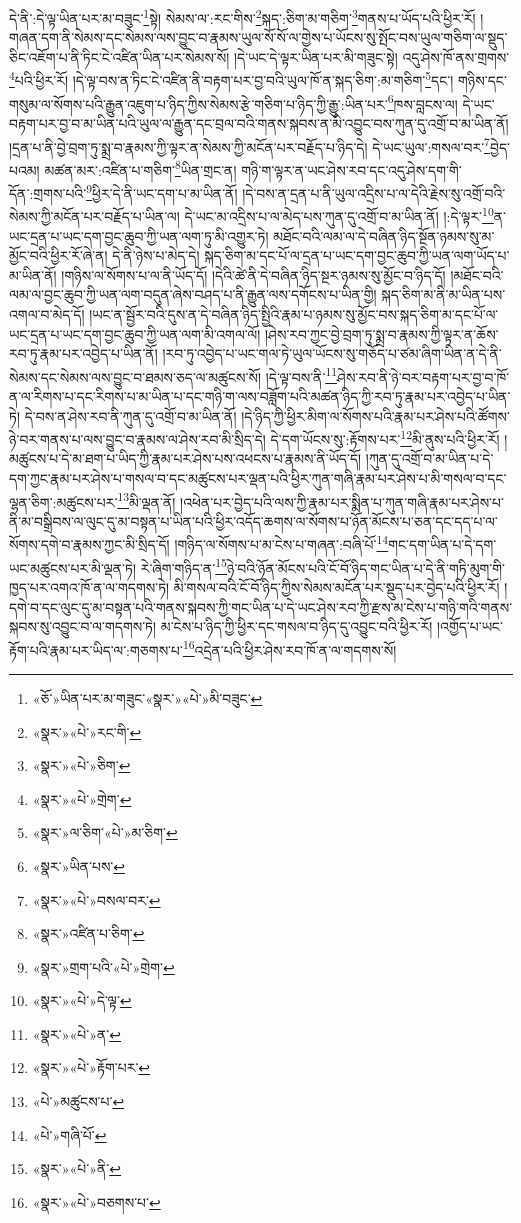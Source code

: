 དེ་ནི་:དེ་ལྟ་ཡིན་པར་མ་བཟུང་\footnote{«ཅོ་»ཡིན་པར་མ་གཟུང་«སྣར་»«པེ་»མི་བཟུང་}སྟེ། སེམས་ལ་:རང་གིས་\footnote{«སྣར་»«པེ་»རང་གི་}སྐད་:ཅིག་མ་གཅིག་\footnote{«སྣར་»«པེ་»ཅིག་}གནས་པ་ཡོད་པའི་ཕྱིར་རོ། །གཞན་དག་ནི་སེམས་དང་སེམས་ལས་བྱུང་བ་རྣམས་ཡུལ་སོ་སོ་ལ་གྱེས་པ་ཡོངས་སུ་སྤོང་བས་ཡུལ་གཅིག་ལ་སྡུད་ཅིང་འཇོག་པ་ནི་ཏིང་ངེ་འཛིན་ཡིན་པར་སེམས་སོ། །དེ་ཡང་དེ་ལྟར་ཡིན་པར་མི་གཟུང་སྟེ། འདུ་ཤེས་ཁོ་ནས་གྲགས་\footnote{«སྣར་»«པེ་»གྲེག་}པའི་ཕྱིར་རོ། །དེ་ལྟ་བས་ན་ཏིང་ངེ་འཛིན་ནི་བརྟག་པར་བྱ་བའི་ཡུལ་ཁོ་ན་སྐད་ཅིག་:མ་གཅིག་\footnote{«སྣར་»ལ་ཅིག་«པེ་»མ་ཅིག་}དང་། གཉིས་དང་གསུམ་ལ་སོགས་པའི་རྒྱུན་འཇུག་པ་ཉིད་ཀྱིས་སེམས་རྩེ་གཅིག་པ་ཉིད་ཀྱི་རྒྱུ་:ཡིན་པར་\footnote{«སྣར་»ཡིན་པས་}ཁས་བླངས་ལ། དེ་ཡང་བརྟག་པར་བྱ་བ་མ་ཡིན་པའི་ཡུལ་ལ་རྒྱུན་དང་བྲལ་བའི་གནས་སྐབས་ན་མི་འབྱུང་བས་ཀུན་དུ་འགྲོ་བ་མ་ཡིན་ནོ། །དྲན་པ་ནི་བྱེ་བྲག་ཏུ་སྨྲ་བ་རྣམས་ཀྱི་ལྟར་ན་སེམས་ཀྱི་མངོན་པར་བརྗོད་པ་ཉིད་དེ། དེ་ཡང་ཡུལ་:གསལ་བར་\footnote{«སྣར་»«པེ་»བསལ་བར་}བྱེད་པའམ། མཚན་མར་:འཛིན་པ་གཅིག་\footnote{«སྣར་»འཛིན་པ་ཅིག་}ཡིན་གྲང་ན། གཉི་ག་ལྟར་ན་ཡང་ཤེས་རབ་དང་འདུ་ཤེས་དག་གི་དོན་:གྲགས་པའི་\footnote{«སྣར་»གྲག་པའི་«པེ་»གྲེག་}ཕྱིར་དེ་ནི་ཡང་དག་པ་མ་ཡིན་ནོ། །དེ་བས་ན་དྲན་པ་ནི་ཡུལ་འདྲིས་པ་ལ་དེའི་རྗེས་སུ་འགྲོ་བའི་སེམས་ཀྱི་མངོན་པར་བརྗོད་པ་ཡིན་ལ། དེ་ཡང་མ་འདྲིས་པ་ལ་མེད་པས་ཀུན་དུ་འགྲོ་བ་མ་ཡིན་ནོ། །:དེ་ལྟར་\footnote{«སྣར་»«པེ་»དེ་ལྟ་}ན་ཡང་དྲན་པ་ཡང་དག་བྱང་ཆུབ་ཀྱི་ཡན་ལག་ཏུ་མི་འགྱུར་ཏེ། མཐོང་བའི་ལམ་ལ་དེ་བཞིན་ཉིད་སྔོན་ཉམས་སུ་མ་མྱོང་བའི་ཕྱིར་རོ་ཞེ་ན། དེ་ནི་ཉེས་པ་མེད་དེ། སྐད་ཅིག་མ་དང་པོ་ལ་དྲན་པ་ཡང་དག་བྱང་ཆུབ་ཀྱི་ཡན་ལག་ཡོད་པ་མ་ཡིན་ནོ། །གཉིས་ལ་སོགས་པ་ལ་ནི་ཡོད་དོ། །དེའི་ཚེ་ནི་དེ་བཞིན་ཉིད་སྔར་ཉམས་སུ་མྱོང་བ་ཉིད་དོ། །མཐོང་བའི་ལམ་ལ་བྱང་ཆུབ་ཀྱི་ཡན་ལག་བདུན་ཞེས་བཤད་པ་ནི་རྒྱུན་ལས་དགོངས་པ་ཡིན་གྱི། སྐད་ཅིག་མ་ནི་མ་ཡིན་པས་འགལ་བ་མེད་དོ། །ཡང་ན་སྦྱོར་བའི་དུས་ན་དེ་བཞིན་ཉིད་སྤྱིའི་རྣམ་པ་ཉམས་སུ་མྱོང་བས་སྐད་ཅིག་མ་དང་པོ་ལ་ཡང་དྲན་པ་ཡང་དག་བྱང་ཆུབ་ཀྱི་ཡན་ལག་མི་འགལ་ལོ། །ཤེས་རབ་ཀྱང་བྱེ་བྲག་ཏུ་སྨྲ་བ་རྣམས་ཀྱི་ལྟར་ན་ཆོས་རབ་ཏུ་རྣམ་པར་འབྱེད་པ་ཡིན་ནོ། །རབ་ཏུ་འབྱེད་པ་ཡང་གལ་ཏེ་ཡུལ་ཡོངས་སུ་གཅོད་པ་ཙམ་ཞིག་ཡིན་ན་དེ་ནི་སེམས་དང་སེམས་ལས་བྱུང་བ་ཐམས་ཅད་ལ་མཚུངས་སོ། །དེ་ལྟ་བས་ནི་\footnote{«སྣར་»«པེ་»ན་}ཤེས་རབ་ནི་ཉེ་བར་བརྟག་པར་བྱ་བ་ཁོ་ན་ལ་རིགས་པ་དང་རིགས་པ་མ་ཡིན་པ་དང་གཉི་ག་ལས་བཟློག་པའི་མཚན་ཉིད་ཀྱི་རབ་ཏུ་རྣམ་པར་འབྱེད་པ་ཡིན་ཏེ། དེ་བས་ན་ཤེས་རབ་ནི་ཀུན་དུ་འགྲོ་བ་མ་ཡིན་ནོ། །དེ་ཉིད་ཀྱི་ཕྱིར་མིག་ལ་སོགས་པའི་རྣམ་པར་ཤེས་པའི་ཚོགས་ཉེ་བར་གནས་པ་ལས་བྱུང་བ་རྣམས་ལ་ཤེས་རབ་མི་སྲིད་དེ། དེ་དག་ཡོངས་སུ་:རྟོགས་པར་\footnote{«སྣར་»«པེ་»རྟོག་པར་}མི་ནུས་པའི་ཕྱིར་རོ། །མཚུངས་པ་དེ་མ་ཐག་པ་ཡིད་ཀྱི་རྣམ་པར་ཤེས་པས་འཕངས་པ་རྣམས་ནི་ཡོད་དོ། །ཀུན་དུ་འགྲོ་བ་མ་ཡིན་པ་དེ་དག་ཀྱང་རྣམ་པར་ཤེས་པ་གསལ་བ་དང་མཚུངས་པར་ལྡན་པའི་ཕྱིར་ཀུན་གཞི་རྣམ་པར་ཤེས་པ་མི་གསལ་བ་དང་ལྷན་ཅིག་:མཚུངས་པར་\footnote{«པེ་»མཚུངས་པ་}མི་ལྡན་ནོ། །འཕེན་པར་བྱེད་པའི་ལས་ཀྱི་རྣམ་པར་སྨིན་པ་ཀུན་གཞི་རྣམ་པར་ཤེས་པ་ནི་མ་བསྒྲིབས་ལ་ལུང་དུ་མ་བསྟན་པ་ཡིན་པའི་ཕྱིར་འདོད་ཆགས་ལ་སོགས་པ་ཉོན་མོངས་པ་ཅན་དང་དད་པ་ལ་སོགས་དགེ་བ་རྣམས་ཀྱང་མི་སྲིད་དོ། །གཉིད་ལ་སོགས་པ་མ་ངེས་པ་གཞན་:བཞི་པོ་\footnote{«པེ་»གཞི་པོ་}གང་དག་ཡིན་པ་དེ་དག་ཡང་མཚུངས་པར་མི་ལྡན་ཏེ། རེ་ཞིག་གཉིད་ན་\footnote{«སྣར་»«པེ་»ནི་}ཉེ་བའི་ཉོན་མོངས་པའི་ངོ་བོ་ཉིད་གང་ཡིན་པ་དེ་ནི་གཏི་མུག་གི་ཁྱད་པར་འགའ་ཁོ་ན་ལ་གདགས་ཏེ། མི་གསལ་བའི་ངོ་བོ་ཉིད་ཀྱིས་སེམས་མངོན་པར་སྡུད་པར་བྱེད་པའི་ཕྱིར་རོ། །དགེ་བ་དང་ལུང་དུ་མ་བསྟན་པའི་གནས་སྐབས་ཀྱི་གང་ཡིན་པ་དེ་ཡང་ཤེས་རབ་ཀྱི་རྫས་མ་ངེས་པ་གཉི་གའི་གནས་སྐབས་སུ་འབྱུང་བ་ལ་གདགས་ཏེ། མ་ངེས་པ་ཉིད་ཀྱི་ཕྱིར་དང་གསལ་བ་ཉིད་དུ་འབྱུང་བའི་ཕྱིར་རོ། །འགྱོད་པ་ཡང་རྟོག་པའི་རྣམ་པར་ཡིད་ལ་:གཅགས་པ་\footnote{«སྣར་»«པེ་»བཅགས་པ་}འདྲེན་པའི་ཕྱིར་ཤེས་རབ་ཁོ་ན་ལ་གདགས་སོ། 